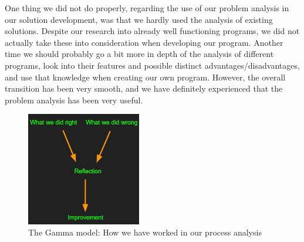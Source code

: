 One thing we did not do properly, regarding the use of our problem analysis in our solution development, was that we hardly used the analysis of existing solutions. Despite our research into already well functioning programs, we did not actually take these into consideration when developing our program. Another time we should probably go a bit more in depth of the analysis of different programs, look into their features and possible distinct advantages/disadvantages, and use that knowledge when creating our own program. However, the overall transition has been very smooth, and we have definitely experienced that the problem analysis has been very useful.
\begin{figure}[ht!]
    \centering
    \includegraphics[width=5cm]{media/Gamma.PNG}
    \caption{The Gamma model: How we have worked in our process analysis}
    \label{fig:Gamma}
\end{figure}